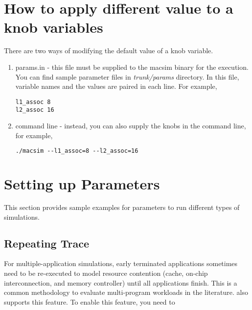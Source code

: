 \section{How to apply different value to a knob variables}

There are two ways of modifying the default value of a knob variable.

\begin{enumerate}
  \item params.in - this file must be supplied to the macsim binary
  for the execution. You can find sample parameter files
  in \textit{trunk/params} directory. In this file, variable names and
  the values are paired in each line. For example,

\begin{Verbatim}
l1_assoc 8
l2_assoc 16
\end{Verbatim}


  \item command line - instead, you can also supply the knobs in the command line, for example,

\begin{Verbatim}
./macsim --l1_assoc=8 --l2_assoc=16
\end{Verbatim}

\end{enumerate}





\section{Setting up Parameters}
\label{sec:parameter}

This section provides sample examples for parameters to run different
types of simulations.


\subsection{Repeating Trace}

For multiple-application simulations, early terminated applications
sometimes need to be re-executed to model resource contention (cache,
on-chip interconnection, and memory controller) until all applications
finish. This is a common methodology to evaluate multi-program
workloads in the literature. \SIM also supports this feature. To
enable this feature, you need to

